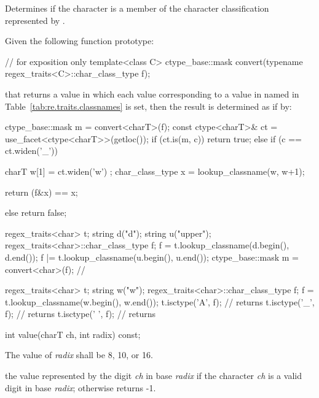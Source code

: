 \begin{itemdescr}
\pnum
\effects  Determines if the character  is a member of the character
classification represented by .

\pnum
\returns Given the following function prototype:
\begin{codeblock}
// for exposition only
template<class C>
  ctype_base::mask convert(typename regex_traits<C>::char_class_type f);
\end{codeblock}
that returns a value in which each  value corresponding to
a value in  named in Table~\ref{tab:re.traits.classnames} is set, then the
result is determined as if by:
\begin{codeblock}
ctype_base::mask m = convert<charT>(f);
const ctype<charT>& ct = use_facet<ctype<charT>>(getloc());
if (ct.is(m, c)) {
  return true;
} else if (c == ct.widen('_')) {
  charT w[1] = { ct.widen('w') };
  char_class_type x = lookup_classname(w, w+1);
  
  return (f&x) == x;
} else {
  return false;
} 
\end{codeblock}
\enterexample
\begin{codeblock}

regex_traits<char> t;
string d("d");
string u("upper");
regex_traits<char>::char_class_type f;
f = t.lookup_classname(d.begin(), d.end());
f |= t.lookup_classname(u.begin(), u.end());
ctype_base::mask m = convert<char>(f); // 
\end{codeblock}
\exitexample
\enterexample
\begin{codeblock}

regex_traits<char> t;
string w("w");
regex_traits<char>::char_class_type f;
f = t.lookup_classname(w.begin(), w.end());
t.isctype('A', f); // returns 
t.isctype('_', f); // returns 
t.isctype(' ', f); // returns 
\end{codeblock}
\exitexample

\end{itemdescr}

%
%
\begin{itemdecl}
int value(charT ch, int radix) const;
\end{itemdecl}

\begin{itemdescr}
\pnum
\precondition  The value of \textit{radix} shall be 8, 10, or 16.

\pnum
\returns  the value represented by the digit \textit{ch} in base
\textit{radix} if the character \textit{ch} is a valid digit in base
\textit{radix}; otherwise returns -1.
\end{itemdescr}


